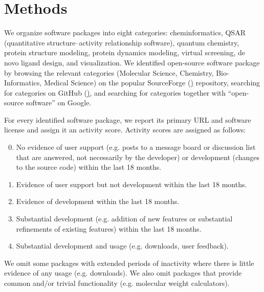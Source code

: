 \section{Methods}

We organize software packages into eight categories: cheminformatics, QSAR (quantitative structure–activity relationship software), quantum chemistry, protein structure modeling, protein dynamics modeling, virtual screening, de novo ligand design, and visualization.
We identified open-source software package by browsing the relevant categories (Molecular Science, Chemistry, Bio-Informatics, Medical Science) on the popular SourceForge (\href{http://sourceforge.net}) repository, searching for categories on GitHub (\href{http://github.com}), and searching for categories together with ``open-source software'' on Google.

For every identified software package, we report its primary URL and software license and assign it an activity score. Activity scores are assigned as follows: 
\begin{enumerate}
  \setcounter{enumi}{-1}
  \item No evidence of user support (e.g. posts to a message board or discussion list that are answered, not necessarily by the developer) or development (changes to the source code) within the last 18 months.
  \item Evidence of user support but not development within the last 18 months.
  \item Evidence of development within the last 18 months.
  \item Substantial development (e.g. addition of new features or substantial refinements of existing features) within the last 18 months.
  \item Substantial development and usage (e.g. downloads, user feedback).
\end{enumerate}

We omit some packages with extended periods of inactivity where there is little evidence of any usage (e.g. downloads).  We also omit packages that provide common and/or trivial functionality (e.g. molecular weight calculators).



 
 

  
  
